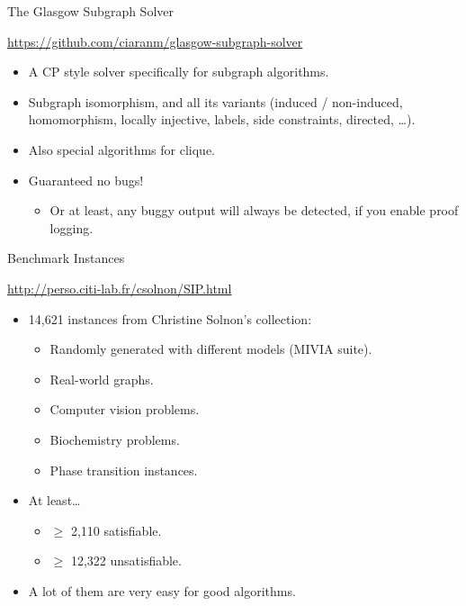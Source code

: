 \documentclass[aspectratio=169,compress,10pt]{beamer}
\begin{document}
\begin{frame}{The Glasgow Subgraph Solver}
    \begin{center}
        \url{https://github.com/ciaranm/glasgow-subgraph-solver}
    \end{center}

    \begin{itemize}
        \item A CP style solver specifically for subgraph algorithms.
        \item Subgraph isomorphism, and all its variants (induced / non-induced, homomorphism,
            locally injective, labels, side constraints, directed, \ldots).
        \item Also special algorithms for clique.
        \item Guaranteed no bugs!
            \begin{itemize}
                \item<2-> Or at least, any buggy output will always be detected, if you enable proof
                    logging.
            \end{itemize}
    \end{itemize}
\end{frame}

\begin{frame}{Benchmark Instances}
    \begin{center}
        \url{http://perso.citi-lab.fr/csolnon/SIP.html}
    \end{center}

    \begin{itemize}
        \item 14,621 instances from Christine Solnon's collection:
            \begin{itemize}
                \item Randomly generated with different models (MIVIA suite).
                \item Real-world graphs.
                \item Computer vision problems.
                \item Biochemistry problems.
                \item Phase transition instances.
            \end{itemize}
        \item At least\ldots
            \begin{itemize}
                \item $\ge$ 2,110 satisfiable.
                \item $\ge$ 12,322 unsatisfiable.
            \end{itemize}
        \item A lot of them are very easy for good algorithms.
    \end{itemize}
\end{frame}
\end{document}
